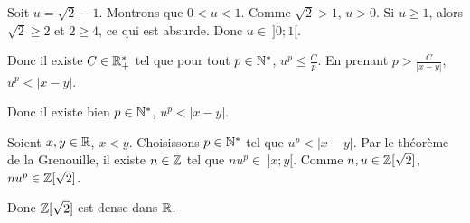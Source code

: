 \documentclass[]{../templates/homework}
\begin{document}
 Soit $u = \sqrt 2 -1$. Montrons que $0<u<1$. Comme $\sqrt 2 > 1$, $u>0$. Si $u \geq 1$, alors $\sqrt 2 \geq 2$ et $2 \geq 4$, ce qui est absurde. Donc $u\in\ ]0;1[$.

Donc il existe $C \in \mathbb R_+^*$ tel que pour tout $p\in\mathbb N^*$, $u^p \leq \frac C p$. En prenant $p > \frac C {|x-y|}$, $u^p < |x-y|$.

Donc il existe bien $p\in\mathbb N^*$, $u^p < |x-y|$.

\question Soient $x,y\in\mathbb R$, $x<y$. Choisissons $p\in\mathbb N^*$ tel que $u^p < |x-y|$. Par le théorème de la Grenouille, il existe $n\in\mathbb Z$ tel que $nu^p \in\ ]x;y[$. Comme $n,u\in\mathbb Z[\sqrt 2]$, $nu^p\in\mathbb Z[\sqrt 2]$.


Donc $\mathbb Z[\sqrt 2]$ est dense dans $\mathbb R$.
\end{document}
